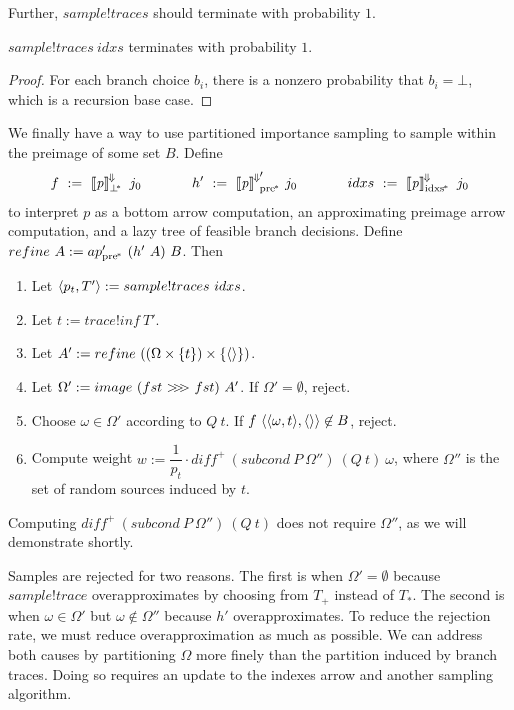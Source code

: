 Further, $sample!traces$ should terminate with probability $1$.

\begin{theorem}
$sample!traces~idxs$ terminates with probability $1$.
\end{theorem}
\begin{proof}
For each branch choice $b_i$, there is a nonzero probability that $b_i = \bot$, which is a recursion base case.
\end{proof}


We finally have a way to use partitioned importance sampling to sample within the preimage of some set $B$.
Define
\begin{equation}
	f\ :=\ \meaningofconv{\mathit{p}}_\pbot~j_0
\hspace{0.5in}
	h'\ :=\ {\meaningofconv{\mathit{p}}}'\ppre~j_0
\hspace{0.5in}
	idxs\ :=\ \meaningofconv{\mathit{p}}\pbi~j_0
\end{equation}
to interpret $\mathit{p}$ as a bottom arrow computation, an approximating preimage arrow computation, and a lazy tree of feasible branch decisions.
Define $refine~A := ap_\mathrm{pre^{\mspace{-2mu}*}}'~(h'~A)~B$.
Then
\begin{enumerate}
	\item Let $\langle{p_t,T'}\rangle := sample!traces~idxs$.
	\item Let $t := trace!inf~T'$.
	\item Let $A' := refine~((\Omega \times \{{t}\}) \times \{{\langle{}\rangle}\})$.
	\item Let $\Omega' := image~(fst~{>}\mspace{-6mu}{>}\mspace{-6mu}{>}~fst)~A'$. If $\Omega' = \emptyset$, reject.
	\item Choose $\omega \in \Omega'$ according to $Q~t$. If $f~\langle{\langle{\omega,t}\rangle,\langle{}\rangle}\rangle \not\in B$, reject.
	\item Compute weight $w := \dfrac{1}{p_t} \cdot diff^+~(subcond~P~\Omega'')~(Q~t)~\omega$, where $\Omega''$ is the set of random sources induced by $t$.
\end{enumerate}
Computing $diff^+~(subcond~P~\Omega'')~(Q~t)$ does not require $\Omega''$, as we will demonstrate shortly.

Samples are rejected for two reasons.
The first is when $\Omega' = \emptyset$ because $sample!trace$ overapproximates by choosing from $T_+$ instead of $T_*$.
The second is when $\omega \in \Omega'$ but $\omega \notin \Omega''$ because $h'$ overapproximates.
To reduce the rejection rate, we must reduce overapproximation as much as possible.
We can address both causes by partitioning $\Omega$ more finely than the partition induced by branch traces.
Doing so requires an update to the indexes arrow and another sampling algorithm.

